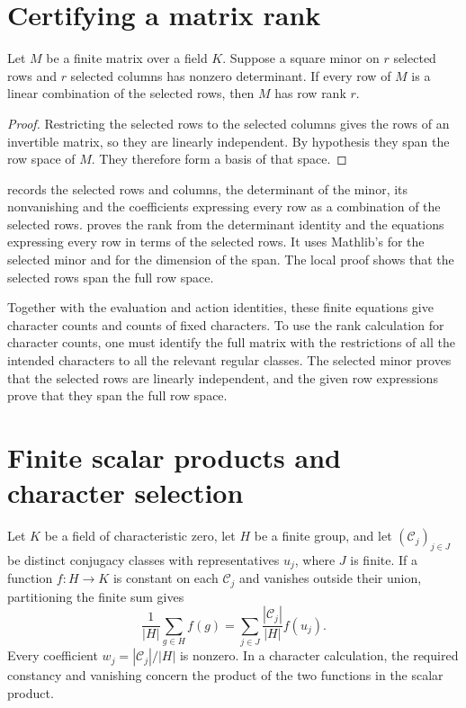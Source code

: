 \section{Certifying a matrix rank}

\begin{proposition}
Let $M$ be a finite matrix over a field $K$. Suppose a square minor
on $r$ selected rows and $r$ selected columns has nonzero determinant.
If every row of $M$ is a linear combination of the selected rows,
then $M$ has row rank $r$.
\end{proposition}
\begin{proof}
Restricting the selected rows to the selected columns gives the
rows of an invertible matrix, so they are linearly independent.
By hypothesis they span the row space of $M$. They therefore form
a basis of that space.
\end{proof}

\begin{implementation}
records the selected rows and columns, the determinant of the
minor, its nonvanishing and the coefficients expressing every row
as a combination of the selected rows.
 proves the rank from
the determinant identity and the equations expressing every row
in terms of the selected rows.
It uses Mathlib's 
for the selected minor and  for the
dimension of the span. The local proof shows that the selected rows
span the full row space.
\end{implementation}

Together with the evaluation and action identities, these finite
equations give character counts and counts of fixed characters.
To use the rank calculation for character counts, one must identify the full
matrix with the restrictions of all the intended characters to all the relevant
regular classes. The selected minor proves that the selected rows are linearly
independent, and the given row expressions prove that they span the full row space.

\section{Finite scalar products and character selection}

Let $K$ be a field of characteristic zero, let $H$ be a finite group,
and let $(\mathcal C_j)_{j\in J}$ be distinct
conjugacy classes with representatives $u_j$, where $J$ is finite.
If a function $f:H\to K$ is constant on each $\mathcal C_j$ and vanishes
outside their union, partitioning the finite sum gives
\[
 \frac{1}{|H|}\sum_{g\in H}f(g)
   =\sum_{j\in J}\frac{|\mathcal C_j|}{|H|}f(u_j).
\]
Every coefficient $w_j=|\mathcal C_j|/|H|$ is nonzero. In a character calculation,
the required constancy and vanishing concern the product of the two
functions in the scalar product.

